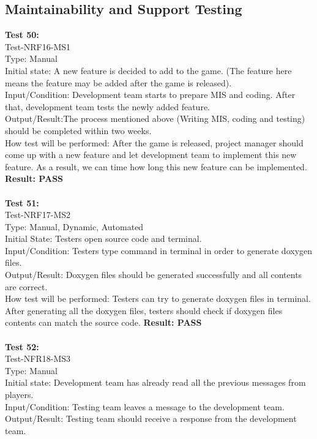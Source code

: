 \documentclass[12pt, titlepage]{article}
\begin{document}
\subsection{Maintainability and Support Testing}
\textbf{Test 50:}\\
Test-NRF16-MS1\\
Type: Manual\\
Initial state: A new feature is decided to add to
the game. (The feature here means the feature may
be added after the game is released).\\
Input/Condition: Development team starts to
prepare MIS and coding. After that, development
team tests the newly added feature.\\
Output/Result:The process mentioned above (Writing
MIS, coding and testing) should be completed
within two weeks.\\
How test will be performed: After the game is 
released, project manager should come up with a 
new feature and let development team to implement this new feature. As a result, we can time how 
long this new feature can be implemented.\\
\textbf{Result: PASS}\\\\
\textbf{Test 51:}\\
Test-NRF17-MS2\\
Type: Manual, Dynamic, Automated\\
Initial State: Testers open source code and 
terminal.\\
Input/Condition: Testers type command in terminal
in order to generate doxygen files.\\
Output/Result: Doxygen files should be generated
successfully and all contents are correct.\\
How test will be performed: Testers can try to generate doxygen files in terminal. After 
generating all the doxygen files, testers should
check if doxygen files contents can match 
the source code.
\textbf{Result: PASS}\\\\
\textbf{Test 52:}\\
Test-NFR18-MS3\\
Type: Manual\\
Initial state: Development team has already read 
all the previous messages from players.\\
Input/Condition: Testing team leaves a message to the
development team.\\
Output/Result: Testing team should receive a response from the development team.\\
\end{document}
